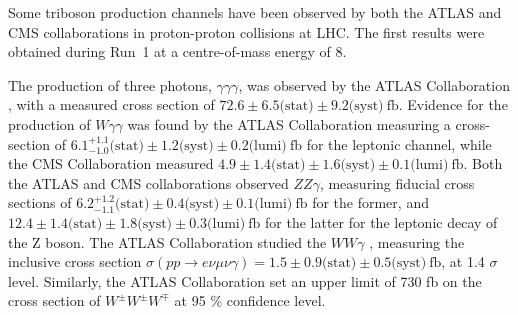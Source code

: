 Some triboson production channels have been observed by both the ATLAS and CMS collaborations in proton-proton collisions at LHC.
The first results were obtained during Run~1 at a centre-of-mass energy of 8\TeV.

The production of three photons, $\gamma\gamma\gamma$, was observed by the ATLAS Collaboration \cite{STDM-2016-06}, with a measured cross section of $72.6 \pm 6.5 \text{(stat)} \pm 9.2 \text{(syst)}~\text{fb}$.
Evidence for the production of $W\gamma\gamma$ was found by the ATLAS Collaboration \cite{STDM-2013-05} measuring a cross-section of $6.1^{+1.1}_{-1.0} \text{(stat)} \pm 1.2 \text{(syst)} \pm 0.2 \text{(lumi)}~\text{fb}$ for the leptonic channel,
while the CMS Collaboration \cite{SMP-15-008} measured $4.9 \pm 1.4 \text{(stat)} \pm 1.6 \text{(syst)} \pm 0.1 \text{(lumi)}~\text{fb}$.
Both the ATLAS \cite{STDM-2014-01} and CMS collaborations \cite{SMP-15-008} observed $ZZ\gamma$, measuring fiducial cross sections of
$6.2^{+1.2}_{-1.1} \text{(stat)} \pm 0.4 \text{(syst)} \pm 0.1 \text{(lumi)}~\text{fb}$ for the former,
and $12.4 \pm 1.4 \text{(stat)} \pm 1.8 \text{(syst)} \pm 0.3 \text{(lumi)}~\text{fb}$ for the latter for the leptonic decay of the Z boson.
The ATLAS Collaboration studied the $WW\gamma$ \cite{STDM-2016-05}, measuring the inclusive cross section $\sigma(pp \rightarrow e\nu \mu\nu \gamma) = 1.5 \pm 0.9 \text{(stat)} \pm 0.5 \text{(syst)}~\text{fb}$, at 1.4 $\sigma$ level.
Similarly, the ATLAS Collaboration set an upper limit of 730 fb \cite{STDM-2015-07} on the cross section of $W^{\pm}W^{\pm}W^{\mp}$ at 95 \% confidence level.

